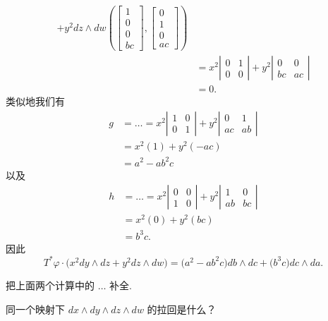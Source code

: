 \begin{align*}
+y^2dz\wedge dw\left(\begin{bmatrix}1\\0\\0\\bc\end{bmatrix},\begin{bmatrix}0\\1\\0\\ac\end{bmatrix}\right)\\
&=x^2\left|\begin{matrix}0&1\\0&0\end{matrix}\right|
+y^2\left|\begin{matrix}0&0\\bc&ac\end{matrix}\right|\\
&=0.
\end{align*}
类似地我们有
\begin{align*}
g&=\ldots=x^2\left|\begin{matrix}1&0\\0&1\end{matrix}\right|
+y^2\left|\begin{matrix}0&1\\ac&ab\end{matrix}\right|\\
&=x^2(1)+y^2(-ac)\\
&=a^2-ab^2c
\end{align*}
以及
\begin{align*}
h&=\ldots=x^2\left|\begin{matrix}0&0\\1&0\end{matrix}\right|
+y^2\left|\begin{matrix}1&0\\ab&bc\end{matrix}\right|\\
&=x^2(0)+y^2(bc)\\
&=b^3c.
\end{align*}
因此
\[
T^*\varphi\cdot\bigl(x^2dy\wedge dz+y^2dz\wedge dw\bigr)=\bigl(a^2-ab^2c\bigr)db\wedge dc+\bigl(b^3c\bigr)dc\wedge da.
\]

\begin{question}\label{q:6-15}
把上面两个计算中的 $\ldots$ 补全.
\end{question}

\begin{question}\label{q:6-16}
同一个映射下 $dx\wedge dy\wedge dz\wedge dw$ 的拉回是什么？
\end{question}

